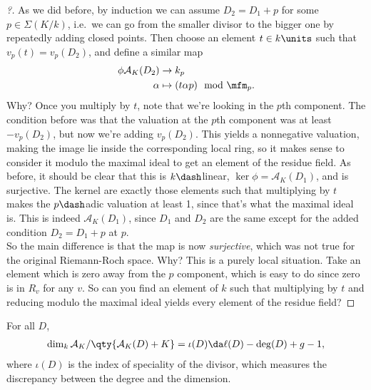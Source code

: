 \begin{proof}[?]

As we did before, by induction we can assume \(D_2 = D_1 + p\) for some
\(p\in \Sigma(K/k)\), i.e.~we can go from the smaller divisor to the
bigger one by repeatedly adding closed points. Then choose an element
\(t\in k\units\) such that \(v_p(t) = v_p(D_2)\), and define a similar
map
\begin{align*}  
\phi \mathcal{A}_K(D_2) &\to k_p \\
\alpha &\mapsto (t\alpha p) \mod \mfm_p
.\end{align*} Why? Once you multiply by \(t\), note that we're looking
in the \(p\)th component. The condition before was that the valuation at
the \(p\)th component was at least \(-v_p(D_2)\), but now we're adding
\(v_p(D_2)\). This yields a nonnegative valuation, making the image lie
inside the corresponding local ring, so it makes sense to consider it
modulo the maximal ideal to get an element of the residue field. As
before, it should be clear that this is \(k\dash\)linear,
\(\ker \phi = \mathcal{A}_K(D_1)\), and is surjective. The kernel are
exactly those elements such that multiplying by \(t\) makes the
\(p\dash\)adic valuation at least 1, since that's what the maximal ideal
is. This is indeed \(\mathcal{A}_K(D_1)\), since \(D_1\) and \(D_2\) are
the same except for the added condition \(D_2 = D_1 + p\) at \(p\).\\

So the main difference is that the map is now \emph{surjective}, which
was not true for the original Riemann-Roch space. Why? This is a purely
local situation. Take an element which is zero away from the \(p\)
component, which is easy to do since zero is in \(R_v\) for any \(v\).
So can you find an element of \(k\) such that multiplying by \(t\) and
reducing modulo the maximal ideal yields every element of the residue
field?

\end{proof}

\begin{theorem}[2.13]

For all \(D\),
\begin{align*}  
\dim_k \mathcal{A}_K / \qty{\mathcal{A}_K(D) + K } = \iota(D) \da \ell(D) - \deg(D) + g - 1
,\end{align*} where \(\iota(D)\) is the index of speciality of the
divisor, which measures the discrepancy between the degree and the
dimension.

\end{theorem}

